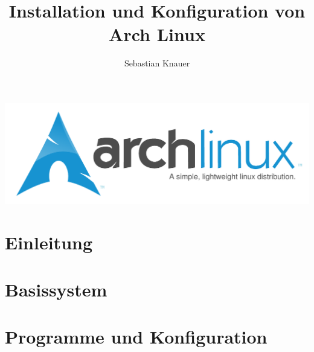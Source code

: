 \documentclass[11pt]{scrartcl}
\author{Sebastian Knauer}
\title{Installation und Konfiguration von Arch Linux}
\begin{document}
\maketitle
\includegraphics[scale=0.75]{arch-logo.pdf}

\section{Einleitung}
\label{sec:einleitung}


\section{Basissystem}
\label{sec:base-system}

    
\section{Programme und Konfiguration}
\label{sec:programme}

\end{document}
